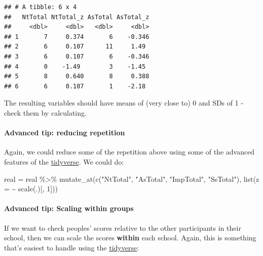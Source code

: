\documentclass[
]{book}
\newenvironment{Shaded}{\begin{snugshade}}{\end{snugshade}}
\newcommand{\AttributeTok}[1]{\textcolor[rgb]{0.77,0.63,0.00}{#1}}
\newcommand{\DecValTok}[1]{\textcolor[rgb]{0.00,0.00,0.81}{#1}}
\newcommand{\FunctionTok}[1]{\textcolor[rgb]{0.00,0.00,0.00}{#1}}
\newcommand{\NormalTok}[1]{#1}
\newcommand{\OtherTok}[1]{\textcolor[rgb]{0.56,0.35,0.01}{#1}}
\newcommand{\SpecialCharTok}[1]{\textcolor[rgb]{0.00,0.00,0.00}{#1}}
\newcommand{\StringTok}[1]{\textcolor[rgb]{0.31,0.60,0.02}{#1}}
\begin{document}
\begin{verbatim}
## # A tibble: 6 x 4
##   NtTotal NtTotal_z AsTotal AsTotal_z
##     <dbl>     <dbl>   <dbl>     <dbl>
## 1       7     0.374       6    -0.346
## 2       6     0.107      11     1.49 
## 3       6     0.107       6    -0.346
## 4       0    -1.49        3    -1.45 
## 5       8     0.640       8     0.388
## 6       6     0.107       1    -2.18
\end{verbatim}

\begin{note}
The resulting variables should have means of (very close to) 0 and SDs
of 1 - check them by calculating.
\end{note}

\hypertarget{advanced-tip-reducing-repetition}{%
\paragraph*{Advanced tip: reducing repetition}\label{advanced-tip-reducing-repetition}}

Again, we could reduce some of the repetition above
using some of the advanced features of the \protect\hyperlink{tidyverse}{tidyverse}.
We could do:

\begin{Shaded}
\begin{Highlighting}[]
\NormalTok{real }\OtherTok{=}\NormalTok{ real }\SpecialCharTok{\%\textgreater{}\%}
  \FunctionTok{mutate\_at}\NormalTok{(}\FunctionTok{c}\NormalTok{(}\StringTok{"NtTotal"}\NormalTok{, }\StringTok{"AsTotal"}\NormalTok{, }\StringTok{"ImpTotal"}\NormalTok{, }\StringTok{"SsTotal"}\NormalTok{),}
            \FunctionTok{list}\NormalTok{(}\AttributeTok{z =} \SpecialCharTok{\textasciitilde{}} \FunctionTok{scale}\NormalTok{(.)[, }\DecValTok{1}\NormalTok{]))}
\end{Highlighting}
\end{Shaded}

\hypertarget{advanced-tip-scaling-within-groups}{%
\paragraph*{Advanced tip: Scaling within groups}\label{advanced-tip-scaling-within-groups}}

If we want to check peoples' scores relative to the other participants
in their school, then we can scale the scores \textbf{within} each school.
Again, this is something that's easiest to handle using the
\protect\hyperlink{tidyverse}{tidyverse}:
\end{document}
